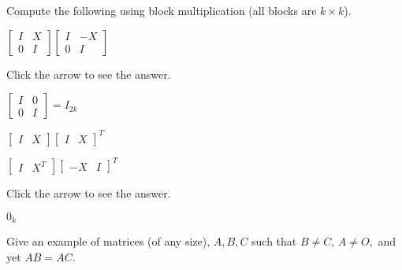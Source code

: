 \documentclass{ximera}
\begin{document}
\begin{problem}\label{prob:fromBlockMultSection}
Compute the following using block multiplication (all blocks are $k \times k$).
\item
$\left[ \begin{array}{rr}
I & X \\
0 & I
\end{array} \right] \left[ \begin{array}{rr}
I & -X \\
0 & I
\end{array} \right]
$

Click the arrow to see the answer.
\begin{expandable}
$\left[ \begin{array}{cc}
I & 0 \\
0 & I
\end{array} \right] = I_{2k}$
\end{expandable}
    \item
$\left[ \begin{array}{cc}
I & X
\end{array} \right] \left[ \begin{array}{cc}
I & X
\end{array} \right]^{T}
$

\item
$\left[ \begin{array}{cc}
I & X^{T}
\end{array} \right] \left[ \begin{array}{cc}
-X & I
\end{array} \right]^{T}
$

Click the arrow to see the answer.
\begin{expandable}
$0_{k}$
\end{expandable}
\end{problem}

\begin{problem}\label{prb:4.17} Give an example of matrices (of any size), $A,B,C$ such that $B\neq C$, $A\neq O,$
and yet $AB=AC.$
\end{problem}
\end{document}
